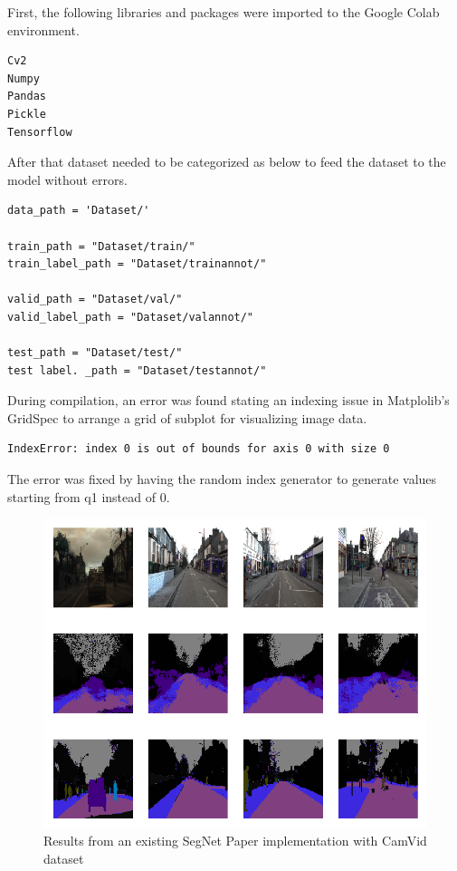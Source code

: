 First, the following libraries and packages were imported to the Google Colab environment.
\begin{lstlisting}
Cv2
Numpy
Pandas
Pickle
Tensorflow
\end{lstlisting}

After that dataset needed to be categorized as below to feed the dataset to the model without errors.
\begin{lstlisting}
data_path = 'Dataset/'

train_path = "Dataset/train/"
train_label_path = "Dataset/trainannot/"

valid_path = "Dataset/val/"
valid_label_path = "Dataset/valannot/"

test_path = "Dataset/test/"
test label. _path = "Dataset/testannot/"
\end{lstlisting}

During compilation, an error was found stating an indexing issue in Matplolib’s GridSpec to arrange a grid of subplot for visualizing image data.
\begin{lstlisting}
IndexError: index 0 is out of bounds for axis 0 with size 0
\end{lstlisting}

The error was fixed by having the random index generator to generate values starting from q1 instead of 0.


\begin{figure}[H]
    \centering
    \includegraphics[width=450pt]{assets/segnet/segnet.png}
    \caption{Results from an existing SegNet Paper implementation with CamVid dataset}
    \label{fig:using:segneresult}
\end{figure}

